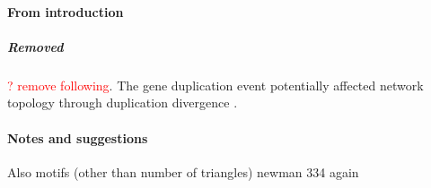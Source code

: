 \paragraph{From introduction}
\subparagraph{Removed}\textcolor{red}{? remove following}. The gene duplication event \cite{grant2016molecular} potentially affected network topology through duplication divergence \cite{ispolatov2005duplication}\cite{taylor2004duplication}\cite{wagner2003global}. 
\paragraph{Notes and suggestions}
Also motifs (other than number of triangles) newman 334 again

